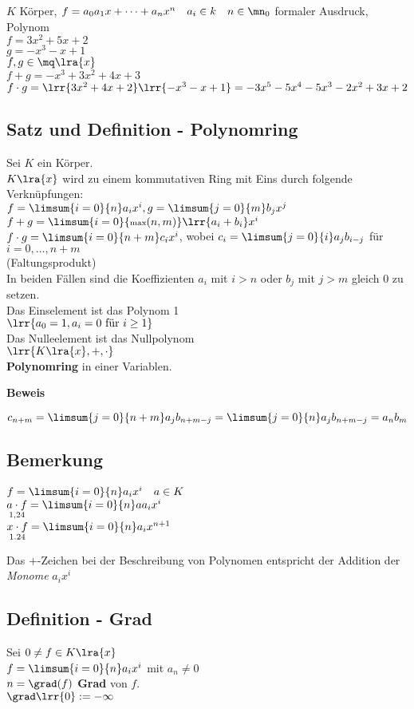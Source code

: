 	$K$ Körper, $f=a_0a_1x+\dots+a_nx^n\quad a_i\in k\quad n\in\mn_0$ formaler Ausdruck, Polynom\\
	$f=3x^2+5x+2$\\
	$g=-x^3-x+1$\\
	$f,g\in\mq\lra{x}$\\
	$f+g=-x^3+3x^2+4x+3$\\
	$f\cdot g=\lrr{3x^2+4x+2}\lrr{-x^3-x+1}=-3x^5-5x^4-5x^3-2x^2+3x+2$
\subsection{Satz und Definition - Polynomring}
	Sei $K$ ein Körper.\\
	$K\lra{x}$ wird zu einem kommutativen Ring mit Eins durch folgende Verknüpfungen:\\
	$f=\limsum{i=0}{n}a_ix^i, g=\limsum{j=0}{m}b_jx^j$\\
	$f+g = \limsum{i=0}{\mbox{\scriptsize max}(n,m)}\lrr{a_i+b_i}x^i$\\
	$f\cdot g= \limsum{i=0}{n+m} c_ix^i$, wobei $c_i=\limsum{j=0}{i}a_jb_{i-j}$ für $i=0,\dots,n+m$\\
	(Faltungsprodukt)\\
	In beiden Fällen sind die Koeffizienten $a_i$ mit $i>n$ oder $b_j$ mit $j>m$ gleich $0$ zu setzen.\\
	Das Einselement ist das Polynom 1\\
	$\lrr{a_0=1,a_i=0\mbox{ für }i\geq 1}$\\
	Das Nulleelement ist das Nullpolynom\\
	$\lrr{K\lra{x},+,\cdot}$\\
	\textbf{Polynomring} in einer Variablen.
	
	\textbf{Beweis}
	
	$c_{n+m}=\limsum{j=0}{n+m}a_jb_{n+m-j}=\limsum{j=0}{n}a_jb_{n+m-j}=a_nb_m$
\subsection{Bemerkung}
		\item $f=\limsum{i=0}{n}a_ix^i\quad a\in K$\\
			$\underset{1,24}{a\cdot f} =\limsum{i=0}{n}aa_ix^i$\\
			$\underset{1.24}{x\cdot f} =\limsum{i=0}{n}a_ix^{n+1}$
		\item Das $+$-Zeichen bei der Beschreibung von Polynomen entspricht der Addition der \textit{Monome} $a_ix^i$
	\subExEnd
\subsection{Definition - Grad}
	Sei $0\neq f\in K\lra{x}$\\
	$f=\limsum{i=0}{n}a_ix^i$ mit $a_n\neq 0$\\
	$n=\grad(f)$ \textbf{Grad} von $f$.\\
	$\grad\lrr{0}:=-\infty$
